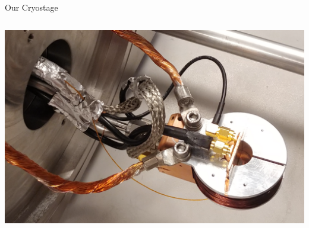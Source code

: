 \documentclass[final]{beamer}
\begin{document}
\begin{frame}[fragile]{}
\begin{columns}[T]
\begin{column}{.49\linewidth}
%
	\begin{block}{\Large Our Cryostage}
		\begin{columns}
			\begin{column}{0.45\columnwidth}
				\includegraphics[width=\columnwidth]{./figures/cryostage01.png}

\end{column}
\end{columns}
\end{block}
\end{column}
\end{columns}
\end{frame}
\end{document}

